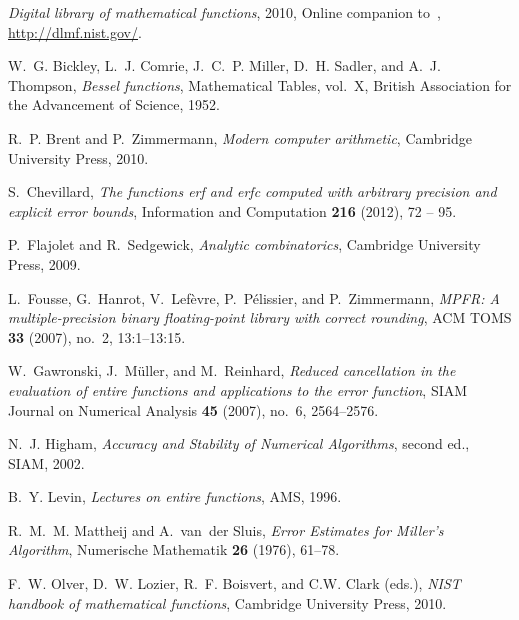 \documentclass[10pt, conference]{IEEEtran}
\begin{document}
\providecommand{\bysame}{\leavevmode\hbox to3em{\hrulefill}\thinspace}
\providecommand{\MR}{\relax\ifhmode\unskip\space\fi MR }
\providecommand{\MRhref}[2]{\href{http://www.ams.org/mathscinet-getitem?mr=#1}{#2}
}
\providecommand{\href}[2]{#2}
\begin{thebibliography}{10}

\emph{Digital library of mathematical functions}, 2010, Online companion
  to~\cite{OlverLozierBoisvertClark2010}, \url{http://dlmf.nist.gov/}.

W.~G. Bickley, L.~J. Comrie, J.~C.~P. Miller, D.~H. Sadler, and A.~J. Thompson,
  \emph{Bessel functions}, Mathematical Tables, vol.~X, British Association for
  the Advancement of Science, 1952.

R.~P. Brent and P.~Zimmermann, \emph{Modern computer arithmetic}, Cambridge
  University Press, 2010.

S.~Chevillard, \emph{The functions erf and erfc computed with arbitrary
  precision and explicit error bounds}, Information and Computation
  \textbf{216} (2012), 72 -- 95.

P.~Flajolet and R.~Sedgewick, \emph{Analytic combinatorics}, Cambridge
  University Press, 2009.

L.~Fousse, G.~Hanrot, V.~Lef\`evre, P.~P\'elissier, and P.~Zimmermann,
  \emph{{MPFR}: A multiple-precision binary floating-point library with correct
  rounding}, {ACM TOMS} \textbf{33} (2007), no.~2, 13:1--13:15.

W.~Gawronski, J.~Müller, and M.~Reinhard, \emph{Reduced cancellation in the
  evaluation of entire functions and applications to the error function}, SIAM
  Journal on Numerical Analysis \textbf{45} (2007), no.~6, 2564--2576.

N.~J. Higham, \emph{{Accuracy and Stability of Numerical Algorithms}}, second
  ed., SIAM, 2002.

B.~Y. Levin, \emph{Lectures on entire functions}, AMS, 1996.

R.~M.~M. Mattheij and A.~van~der Sluis, \emph{{Error Estimates for Miller's
  Algorithm}}, {Numerische Mathematik} \textbf{26} (1976), 61--78.

F.~W. Olver, D.~W. Lozier, R.~F. Boisvert, and C.W. Clark (eds.), \emph{{NIST}
  handbook of mathematical functions}, Cambridge University Press, 2010.


\end{thebibliography}
\end{document}
